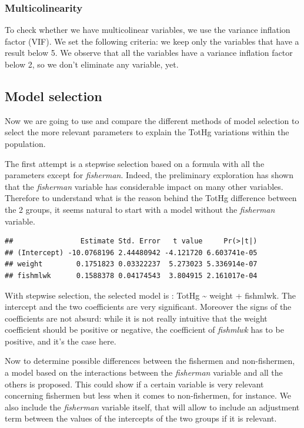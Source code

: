 \documentclass[12pt,]{article}
\begin{document}
\subsubsection{Multicolinearity}\label{multicolinearity}

To check whether we have multicolinear variables, we use the variance
inflation factor (VIF). We set the following criteria: we keep only the
variables that have a result below 5. We observe that all the variables
have a variance inflation factor below 2, so we don't eliminate any
variable, yet.

\subsection{Model selection}\label{model-selection}

Now we are going to use and compare the different methods of model
selection to select the more relevant parameters to explain the TotHg
variations within the population.

The first attempt is a stepwise selection based on a formula with all
the parameters except for \emph{fisherman}. Indeed, the preliminary
exploration has shown that the \emph{fisherman} variable has
considerable impact on many other variables. Therefore to understand
what is the reason behind the TotHg difference between the 2 groups, it
seems natural to start with a model without the \emph{fisherman}
variable.

\begin{verbatim}
##                Estimate Std. Error   t value     Pr(>|t|)
## (Intercept) -10.0768196 2.44480942 -4.121720 6.603741e-05
## weight        0.1751823 0.03322237  5.273023 5.336914e-07
## fishmlwk      0.1588378 0.04174543  3.804915 2.161017e-04
\end{verbatim}

With stepwise selection, the selected model is : TotHg \textasciitilde{}
weight + fishmlwk. The intercept and the two coefficients are very
significant. Moreover the signs of the coefficients are not absurd:
while it is not really intuitive that the weight coefficient should be
positive or negative, the coefficient of \emph{fishmlwk} has to be
positive, and it's the case here.

Now to determine possible differences between the fishermen and
non-fishermen, a model based on the interactions between the
\emph{fisherman} variable and all the others is proposed. This could
show if a certain variable is very relevant concerning fishermen but
less when it comes to non-fishermen, for instance. We also include the
\emph{fisherman} variable itself, that will allow to include an
adjustment term between the values of the intercepts of the two groups
if it is relevant.
\end{document}
